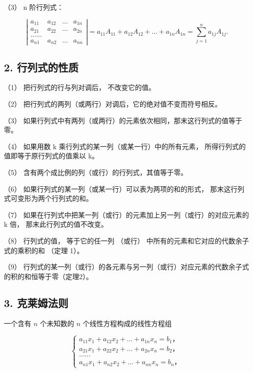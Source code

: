 （3） n 阶行列式：

\[
\left| \begin{array}{cccc} a _ {11} & a _ {12} & \dots & a _ {1 n} \\ a _ {21} & a _ {22} & \dots & a _ {2 n} \\ \dots \dots \\ a _ {n 1} & a _ {n 2} & \dots & a _ {n n} \end{array} \right| = a _ {11} A _ {11} + a _ {12} A _ {12} + \dots + a _ {1 n} A _ {1 n} = \sum_ {j = 1} ^ {n} a _ {1 j} A _ {1 j}.
\]

\subsection{2. 行列式的性质}

（1） 把行列式的行与列对调后， 不改变它的值。

（2） 把行列式的两列（或两行）对调后，它的绝对值不变而符号相反。

（3）
如果行列式中有两列（或两行）的元素依次相同，那末这行列式的值等于零。

（4） 如果用数 k 乘行列式的某一列（或某一行）中的所有元素，
所得行列式的值即等于原行列式的值乘以 k。

（5） 含有两个成比例的列（或行）的行列式，其值等于零。

（6） 如果行列式的某一列（或某一行）可以表为两项的和的形式，
那末这行列式可变形为两个行列式的和。

（7） 如果在行列式中把某一列（或行）的元素加上另一列（或行）的对应元素的
k 倍， 那末此行列式的值不改变。

（8） 行列式的值， 等于它的任一列 （或行）
中所有的元素和它对应的代数余子式的乘积的和 （定理 1）。

（9）
行列式的某一列（或行）的各元素与另一列（或行）对应元素的代数余子式的积的和恒等于零（定理2）。

\subsection{3. 克莱姆法则}

一个含有 \(n\) 个未知数的 \(n\) 个线性方程构成的线性方程组

\[
\left\{ \begin{array}{l} a _ {11} x _ {1} + a _ {12} x _ {2} + \dots + a _ {1 n} x _ {n} = b _ {1}\text{，} \\ a _ {21} x _ {1} + a _ {22} x _ {2} + \dots + a _ {2 n} x _ {n} = b _ {2}\text{，} \\ \dots \dots \\ a _ {n 1} x _ {1} + a _ {n 2} x _ {2} + \dots + a _ {n n} x _ {n} = b _ {n}\text{，} \end{array} \right.
\]

